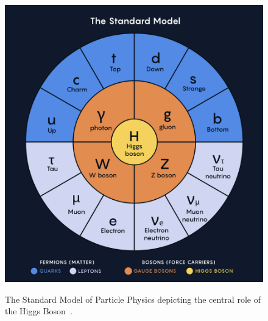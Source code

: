 \begin{figure}[!htbp]
    \centering
    \caption{The Standard Model of Particle Physics depicting the central role of the Higgs Boson~\cite{QuantaMagNewMap}.}
    \includegraphics[scale=0.7]{fig/SM.png}
    \label{fig:SMDiagram}
\end{figure}





